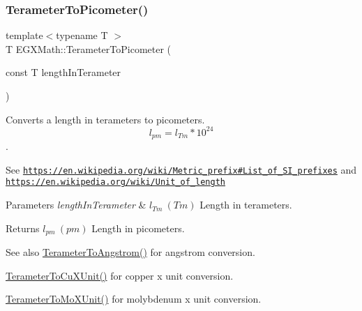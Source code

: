 \subsubsection{\texorpdfstring{Terameter\+To\+Picometer()}{TerameterToPicometer()}}
{\footnotesize\ttfamily template$<$typename T $>$ \\
T E\+G\+X\+Math\+::\+Terameter\+To\+Picometer (\begin{DoxyParamCaption}\item[{const T}]{length\+In\+Terameter }\end{DoxyParamCaption})}



Converts a length in terameters to picometers. \[ l_{pm}=l_{Tm} * 10^{24} \]. 

See \href{https://en.wikipedia.org/wiki/Metric_prefix#List_of_SI_prefixes}{\tt https\+://en.\+wikipedia.\+org/wiki/\+Metric\+\_\+prefix\#\+List\+\_\+of\+\_\+\+S\+I\+\_\+prefixes} and \href{https://en.wikipedia.org/wiki/Unit_of_length}{\tt https\+://en.\+wikipedia.\+org/wiki/\+Unit\+\_\+of\+\_\+length} 
\begin{DoxyParams}{Parameters}
{\em length\+In\+Terameter} & $ l_{Tm}\ (Tm)$ Length in terameters. \\
\hline
\end{DoxyParams}
\begin{DoxyReturn}{Returns}
$ l_{pm}\ (pm)$ Length in picometers. 
\end{DoxyReturn}
\begin{DoxySeeAlso}{See also}
\mbox{\hyperlink{group___e_g_x_math-_conversions-_length_conversions-_s_i-_terameter-_non-_s_i_gaab75399e224bea4ea7ddb8bf5f557ee0}{Terameter\+To\+Angstrom()}} for angstrom conversion. 

\mbox{\hyperlink{group___e_g_x_math-_conversions-_length_conversions-_s_i-_terameter-_non-_s_i_ga5eab9d29867c570350691cca342c9472}{Terameter\+To\+Cu\+X\+Unit()}} for copper x unit conversion. 

\mbox{\hyperlink{group___e_g_x_math-_conversions-_length_conversions-_s_i-_terameter-_non-_s_i_ga391bcf9b529c2e20f2773c699bb0197a}{Terameter\+To\+Mo\+X\+Unit()}} for molybdenum x unit conversion. 
\end{DoxySeeAlso}
\mbox{\label{group___e_g_x_math-_conversions-_length_conversions-_s_i-_terameter-_s_i_ga8cdb09d983691434d45c52808465c92f}} 
